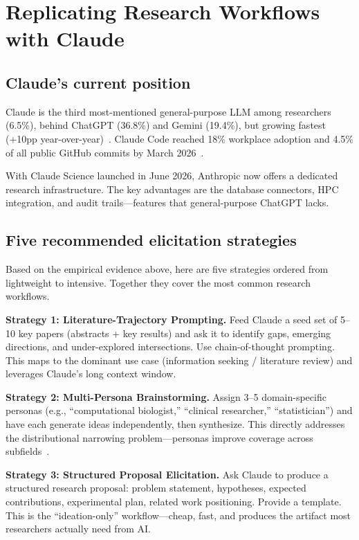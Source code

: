 \documentclass[11pt,a4paper]{article}
\begin{document}
\section{Replicating Research Workflows with Claude}
\label{sec:claude}

\subsection{Claude's current position}

Claude is the third most-mentioned general-purpose LLM among researchers (6.5\%), behind ChatGPT (36.8\%) and Gemini (19.4\%), but growing fastest (+10pp year-over-year)~\cite{wiley2025}. Claude Code reached 18\% workplace adoption and 4.5\% of all public GitHub commits by March 2026~\cite{jetbrains2026}.

With Claude Science launched in June 2026, Anthropic now offers a dedicated research infrastructure. The key advantages are the database connectors, HPC integration, and audit trails---features that general-purpose ChatGPT lacks.

\subsection{Five recommended elicitation strategies}

Based on the empirical evidence above, here are five strategies ordered from lightweight to intensive. Together they cover the most common research workflows.

\textbf{Strategy 1: Literature-Trajectory Prompting.} Feed Claude a seed set of 5--10 key papers (abstracts + key results) and ask it to identify gaps, emerging directions, and under-explored intersections. Use chain-of-thought prompting. This maps to the dominant use case (information seeking / literature review) and leverages Claude's long context window.

\textbf{Strategy 2: Multi-Persona Brainstorming.} Assign 3--5 domain-specific personas (e.g., ``computational biologist,'' ``clinical researcher,'' ``statistician'') and have each generate ideas independently, then synthesize. This directly addresses the distributional narrowing problem---personas improve coverage across subfields~\cite{ideationarena2026}.

\textbf{Strategy 3: Structured Proposal Elicitation.} Ask Claude to produce a structured research proposal: problem statement, hypotheses, expected contributions, experimental plan, related work positioning. Provide a template. This is the ``ideation-only'' workflow---cheap, fast, and produces the artifact most researchers actually need from AI.
\end{document}
